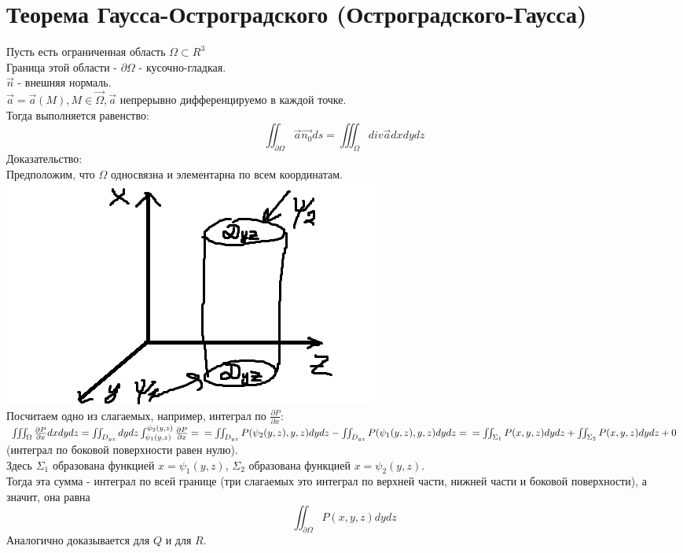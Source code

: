 \documentclass[12pt]{article}
\begin{document}
\section{Теорема Гаусса-Остроградского (Остроградского-Гаусса)}
Пусть есть ограниченная область $\Omega \subset R^3$\\
Граница этой области - $\partial \Omega$ - кусочно-гладкая.\\
$\overrightarrow{n}$ - внешняя нормаль.\\
$\overrightarrow{a} = \overrightarrow{a} (M), M \in \overrightarrow{\Omega}, \overrightarrow{a}$ непрерывно дифференцируемо в каждой точке.\\
Тогда выполняется равенство:\\
$$\iint_{\partial\Omega} \overrightarrow{a} \overrightarrow{n_0} ds = \iiint_{\Omega} div \overrightarrow{a} dxdydz$$
Доказательство:\\
Предположим, что $\Omega$ односвязна и элементарна по всем координатам.\\
\includegraphics{ostrogradGaussProof}\\
Посчитаем одно из слагаемых, например, интеграл по $\frac{\partial P}{\partial x}$:\\
$\iiint_\Omega \frac{\partial P}{\partial x} dxdydz = \iint_{D_{yz}} dydz \int_{\psi_1(y,z)}^{\psi_2(y,z)} \frac{\partial P}{\partial x} =\\= \iint_{D_{yz}} P(\psi_2(y,z),y,z)dydz-\iint_{D_{yz}} P(\psi_1(y,z),y,z)dydz =\\= \iint_{\Sigma_1} P(x,y,z) dydz + \iint_{\Sigma_2} P(x,y,z) dydz + 0$ (интеграл по боковой поверхности равен нулю).\\
Здесь $\Sigma_1$ образована функцией $x = \psi_1(y,z)$, $\Sigma_2$ образована функцией $x = \psi_2(y,z)$.\\
Тогда эта сумма - интеграл по всей границе (три слагаемых это интеграл по верхней части, нижней части и боковой поверхности), а значит, она равна\\
$$\iint_{\partial \Omega} P(x,y,z) dydz$$
Аналогично доказывается для $Q$ и для $R$.\\
\end{document}
